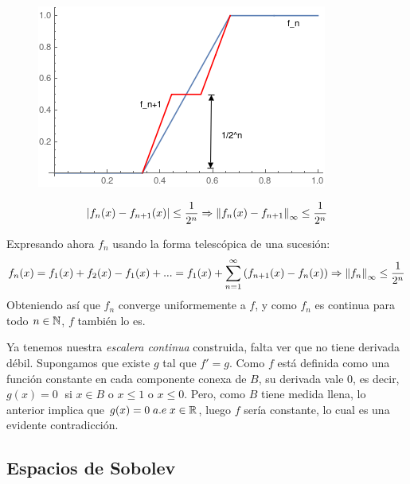 \begin{figure}[H]
   \center
  \includegraphics[scale=0.6]{img/convergenciaescalera.png}
\end{figure}
\[
\left| f_n(x)-f_{n+1}(x) \right|\leq\frac{1}{2^n} \Rightarrow \left\lVert f_n(x)-f_{n+1}\right\rVert_{\infty}\leq \frac{1}{2^n}
\]

Expresando ahora $f_n$ usando la forma telescópica de una sucesión:
\[
f_n(x)=f_1(x)+f_2(x)-f_1(x)+...=f_1(x)+\sum_{n=1}^\infty\left(f_{n+1}(x)-f_n(x)\right) \Rightarrow \left\lVert f_n\right\rVert_{\infty}\leq \frac{1}{2^n}
\]
Obteniendo así que $f_n$ converge uniformemente a $f$, y como $f_n$ es continua para todo $n\in\mathbb{N}$, $f$ también lo es. 

Ya tenemos nuestra \textit{escalera continua} construida, falta ver que no tiene derivada débil. Supongamos que existe $g$ tal que $f'=g$. Como $f$ está definida como una función constante en cada componente conexa de $B$, su derivada vale 0, es decir, $g(x)=0\;$ si $x \in B$ o $x\leq 1$ o $x\leq 0$. Pero, como $B$ tiene medida llena, lo anterior implica que $g(x)=0 \; a.e \; x\in\mathbb{R}$, luego $f$ sería constante, lo cual es una evidente contradicción.

\subsection{Espacios de Sobolev}

